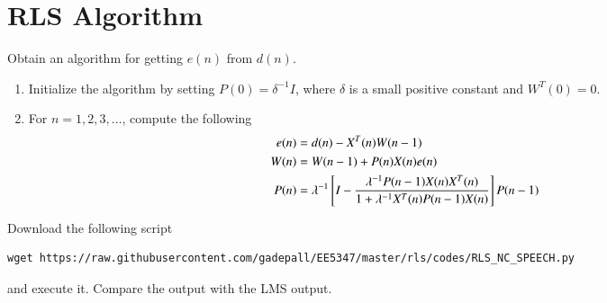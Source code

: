 \documentclass[journal,12pt,twocolumn]{IEEEtran}
\begin{document}
\section{RLS Algorithm}
\begin{problem}
Obtain an algorithm for getting $e(n)$ from $d(n)$.
\end{problem}
\solution
\begin{enumerate}
\item Initialize the algorithm by setting $P(0) = \delta ^{-1} I$, where $\delta$ is a small positive constant and
$W^{T}(0)=0$. 
\item For $n=1,2,3, \dots$,
 compute the following
 {\small
 \begin{align}
e(n) &= d(n)- X^{T}(n)W(n-1)\\
W(n)&= W(n-1)+P(n)X(n)e(n)\\
P(n)&=\lambda ^{-1}{}\left[I -\frac{\lambda ^{-1}P(n-1)X(n)X^{T}(n)}{1+ \lambda ^{-1}X^{T}(n)P(n-1)X(n)}\right]P(n-1)
\end{align}
}
\end{enumerate}
\begin{problem}
Download the following script
\begin{lstlisting}
wget https://raw.githubusercontent.com/gadepall/EE5347/master/rls/codes/RLS_NC_SPEECH.py
\end{lstlisting}
and execute it. Compare the output with the LMS output.
\end{problem}
%
\end{document}
